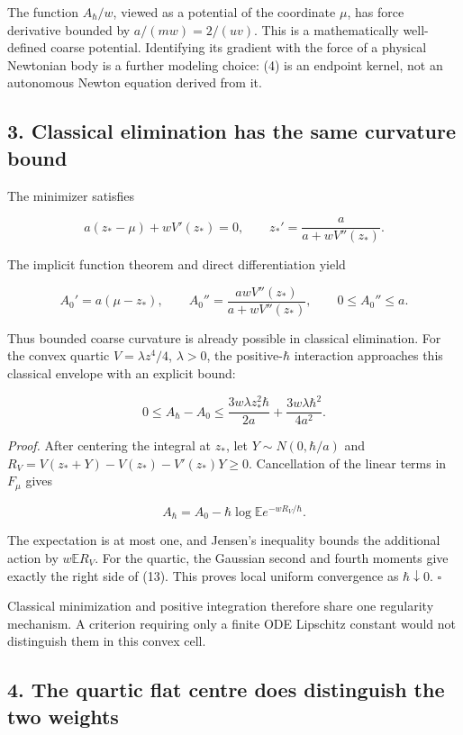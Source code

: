 \documentclass[11pt,a4paper]{article}
\begin{document}
The function \(A_\hbar/w\), viewed as a potential of the coordinate
\(\mu\), has force derivative bounded by \(a/(mw)=2/(uv)\). This is a
mathematically well-defined coarse potential. Identifying its gradient
with the force of a physical Newtonian body is a further modeling
choice: (4) is an endpoint kernel, not an autonomous Newton equation
derived from it.

\hypertarget{classical-elimination-has-the-same-curvature-bound}{%
\subsection{3. Classical elimination has the same curvature
bound}\label{classical-elimination-has-the-same-curvature-bound}}

The minimizer satisfies

\[a(z_*-\mu)+wV'(z_*)=0,\qquad
 z_*'=\frac a{a+wV''(z_*)}.
 \tag{11}
\]

The implicit function theorem and direct differentiation yield

\[
 A_0'=a(\mu-z_*),\qquad
 A_0''=\frac{awV''(z_*)}{a+wV''(z_*)},\qquad
 0\le A_0''\le a.
 \tag{12}
\]

Thus bounded coarse curvature is already possible in classical
elimination. For the convex quartic \(V=\lambda z^4/4\), \(\lambda>0\),
the positive-\(\hbar\) interaction approaches this classical envelope
with an explicit bound:

\[
 0\le A_\hbar-A_0
 \le\frac{3w\lambda z_*^2\hbar}{2a}
        +\frac{3w\lambda\hbar^2}{4a^2}.
 \tag{13}
\]

\emph{Proof.} After centering the integral at \(z_*\), let
\(Y\sim N(0,\hbar/a)\) and \(R_V=V(z_*+Y)-V(z_*)-V'(z_*)Y\ge0\).
Cancellation of the linear terms in \(F_\mu\) gives

\[
 A_\hbar=A_0-\hbar\log\mathbb E
                   e^{-wR_V/\hbar}.
 \tag{14}
\]

The expectation is at most one, and Jensen's inequality bounds the
additional action by \(w\mathbb ER_V\). For the quartic, the Gaussian
second and fourth moments give exactly the right side of (13). This
proves local uniform convergence as \(\hbar\downarrow0\). \(\square\)

Classical minimization and positive integration therefore share one
regularity mechanism. A criterion requiring only a finite ODE Lipschitz
constant would not distinguish them in this convex cell.

\hypertarget{the-quartic-flat-centre-does-distinguish-the-two-weights}{%
\subsection{4. The quartic flat centre does distinguish the two
weights}\label{the-quartic-flat-centre-does-distinguish-the-two-weights}}
\end{document}
